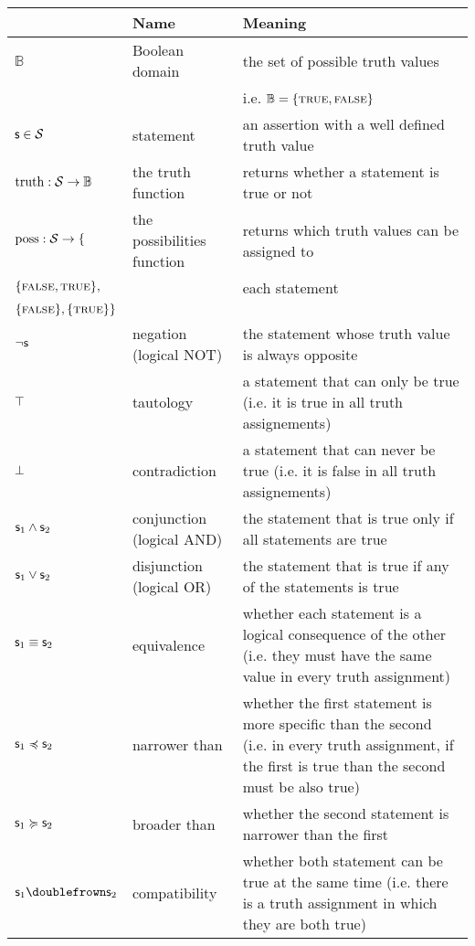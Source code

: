 \documentclass[11pt,letterpaper,fleqn]{memoir} %
\begin{document}
\begin{tabular}{p{} p{} p{}}
	& Name & Meaning  \\ 
	\hline 
	$\mathbb{B}$  & Boolean domain & the set of possible truth values \\ 
	&  & i.e. $\mathbb{B} = \{\textsc{true}, \textsc{false}\}$ \\ 
	\hline 
	$\mathsf{s} \in \mathcal{S}$ & statement & an assertion with a well defined truth value \\ 
	\hline 
	$\operatorname{truth} : \mathcal{S} \to \mathbb{B}$ & the truth function & returns whether a statement is true or not  \\ 
	\hline 
	$\operatorname{poss}: \mathcal{S} \to \{$& the possibilities function & returns which truth values can be assigned to \\ 
	$\{\textsc{false},\textsc{true}\},$ & & each statement \\ 
	$\{\textsc{false}\}, \{\textsc{true}\}\}$ & &  \\ 
	\hline 
	$\neg \mathsf{s}$ & negation (logical NOT) & the statement whose truth value is always opposite \\ 
	\hline 
	$\top$ & tautology & a statement that can only be true (i.e. it is true in all truth assignements) \\ 
	\hline 
	$\bot$ & contradiction & a statement that can never be true (i.e. it is false in all truth assignements) \\ 
	\hline 
	$\mathsf{s}_1 \wedge \mathsf{s}_2$ & conjunction (logical AND) & the statement that is true only if all statements are true \\ 
	\hline 
	$\mathsf{s}_1 \vee \mathsf{s}_2$ & disjunction (logical OR) & the statement that is true if any of the statements is true \\ 
	\hline 
	$\mathsf{s}_1 \equiv \mathsf{s}_2$ & equivalence & whether each statement is a logical consequence of the other (i.e. they must have the same value in every truth assignment) \\ 
	\hline 
	$\mathsf{s}_1 \preccurlyeq \mathsf{s}_2$ & narrower than & whether the first statement is more specific than the second (i.e. in every truth assignment, if the first is true than the second must be also true) \\ 
	\hline 
	$\mathsf{s}_1 \succcurlyeq \mathsf{s}_2$ & broader than & whether the second statement is narrower than the first \\ 
	\hline 
	$\stmt_1 \comp \stmt_2$ & compatibility & whether both statement can be true at the same time (i.e. there is a truth assignment in which they are both true) \\

\end{tabular}
\end{document}
